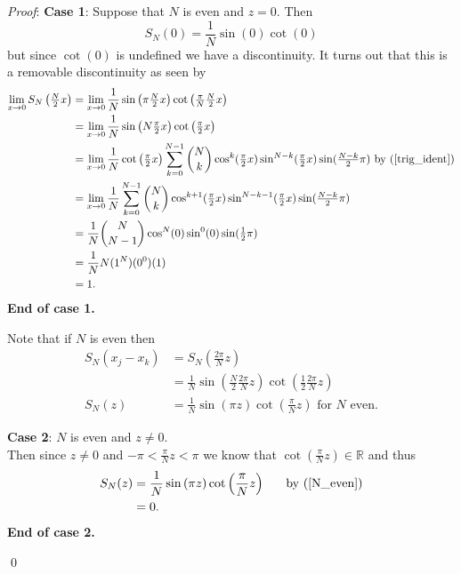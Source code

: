 \documentclass[12pt]{article}
\renewenvironment{proof}{\hspace{-4 ex} \emph{Proof}:}{\qed}
\newcommand{\RR}{\mathbb{R}}
\begin{document}
\begin{proof}
	\textbf{Case 1}: Suppose that $N$ is even and $z=0$. \bigbreak
	Then
	$$
	S_N(0) = \frac{1}{N} \sin \left(0 \right) \cot \left( 0 \right)
	$$
	but since $\cot(0)$ is undefined we have a discontinuity. It turns out that this is a removable discontinuity as seen by
	\begin{align*}
		\lim_{x \to 0}S_N \left( \tfrac{N}{2}x \right) &= \lim_{x \to 0} \frac{1}{N} \sin \left(\pi \tfrac{N}{2}x \right) \cot \left( \tfrac{\pi}{N}\tfrac{N}{2}x \right) \\
		&= \lim_{x \to 0} \frac{1}{N} \sin \left(N \tfrac{\pi}{2}x \right) \cot \left( \tfrac{\pi}{2}x \right) \\
		&= \lim_{x \to 0} \frac{1}{N}  \cot \left( \tfrac{\pi}{2}x \right) \sum_{k=0}^{N-1} {N \choose k} \cos^k(\tfrac{\pi}{2}x) \sin^{N-k}(\tfrac{\pi}{2}x) \sin(\tfrac{N-k}{2}\pi) \text{ by }(\ref{trig_ident})\\
		&= \lim_{x \to 0} \frac{1}{N} \sum_{k=0}^{N-1} {N \choose k} \cos^{k+1}(\tfrac{\pi}{2}x) \sin^{N-k-1}(\tfrac{\pi}{2}x) \sin(\tfrac{N-k}{2}\pi) \\
		&= \frac{1}{N} {N \choose N-1} \cos^{N}(0)\sin^{0}(0) \sin(\tfrac{1}{2}\pi) \\
		&= \frac{1}{N} N (1^{N})(0^0)(1) \\
		&= 1 \text{.}
	\end{align*}
	\textbf{End of case 1.}
	\bigbreak
	
	Note that if $N$ is even then
	\begin{align}
	S_N(x_j - x_k) &= S_N\left( \frac{2\pi}{N}z \right) \nonumber \\
	&= \frac{1}{N} \sin \left(\frac{N}{2}\frac{2\pi}{N}z \right) \cot \left( \frac{1}{2}\frac{2\pi}{N}z \right) \nonumber \\
	S_N(z) &= \frac{1}{N} \sin \left(\pi z \right) \cot \left( \frac{\pi}{N}z \right) \label{N_even} \text{ for }N \text{ even.}
	\end{align}
	
	\textbf{Case 2}: $N$ is even and $z \neq 0$. \\
	Then since $z \neq 0$ and $-\pi < \frac{\pi}{N}z < \pi$ we know that $\cot(\tfrac{\pi}{N}z) \in \RR$ and thus
	\begin{align*}
		S_N(z) &= \frac{1}{N} \sin \left(\pi z \right) \cot \left( \frac{\pi}{N}z \right) \text{\ \ \ \ \ by (\ref{N_even})}\\
		&= 0 \text{.}
	\end{align*}
	\textbf{End of case 2.}
	\bigbreak
	

\end{proof}
\end{document}
